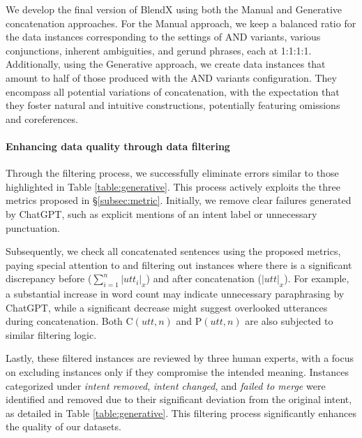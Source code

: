 We develop the final version of BlendX using both the Manual and Generative concatenation approaches.
For the Manual approach, we keep a balanced ratio for the data instances corresponding to the settings of AND variants, various conjunctions, inherent ambiguities, and gerund phrases, each at 1:1:1:1.
Additionally, using the Generative approach, we create data instances that amount to half of those produced with the AND variants configuration.
They encompass all potential variations of concatenation, with the expectation that they foster natural and intuitive constructions, potentially featuring omissions and coreferences.

\paragraph{Enhancing data quality through data filtering} 
Through the filtering process, we successfully eliminate errors similar to those highlighted in Table \ref{table:generative}. 
This process actively exploits the three metrics proposed in \S\ref{subsec:metric}. 
Initially, we remove clear failures generated by ChatGPT, such as explicit mentions of an intent label or unnecessary punctuation. 

Subsequently, we check all concatenated sentences using the proposed metrics, paying special attention to and filtering out instances where there is a significant discrepancy before ($ \sum_{i=1}^n |utt_i|_x $) and after concatenation ($|utt|_{x}$). 
For example, a substantial increase in word count may indicate unnecessary paraphrasing by ChatGPT, while a significant decrease might suggest overlooked utterances during concatenation. 
Both $\mathrm{C}(utt, n)$ and $\mathrm{P}(utt, n)$ are also subjected to similar filtering logic. 

Lastly, these filtered instances are reviewed by three human experts, with a focus on excluding instances only if they compromise the intended meaning. 
Instances categorized under \textit{intent removed}, \textit{intent changed}, and \textit{failed to merge} were identified and removed due to their significant deviation from the original intent, as detailed in Table \ref{table:generative}. 
This filtering process significantly enhances the quality of our datasets.